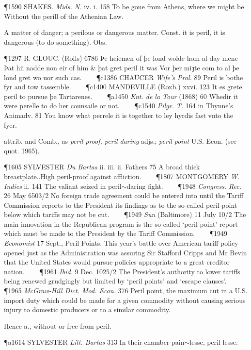 \begin{description}[wide, labelwidth=!, labelindent=0pt]
\begin{myenumerate}
\P 1590 SHAKES.  \textit{Mids. N.} iv. i. 158 To be gone from Athens, where we might be Without the perill of the Athenian Law.

 A matter of danger; a perilous or dangerous matter. Const. it is peril, it is dangerous (to do something). Obs.

\P 1297 R. GLOUC.  (Rolls) 6786 Þe heiemen of þe lond wolde hom al day mene Þat hii nadde non eir of him \& þat gret peril it was Vor þer miȝte com to al þe lond gret wo uor such cas.    
\P c1386 CHAUCER  \textit{Wife's Prol.} 89 Peril is bothe fyr and tow tassemble.    
\P c1400 MANDEVILLE (Roxb.) xxvi. 123 It es grete peril to pursue þe Tartarenes.    
\P a1450  \textit{Knt. de la Tour} (1868) 60 Whedir it were perelle to do her counsaile or not.    
\P c1540  \textit{Pilgr. T.} 164 in Thynne's Animadv. 81 You know what perrele it is together to ley hyrdis fast vnto the fyer.

 attrib. and Comb., as \textit{peril-proof, peril-daring} adjs.; \textit{peril point} U.S. Econ. (see quot. 1965).

\P 1605 SYLVESTER  \textit{Du Bartas} ii. iii. ii. Fathers 75 A broad thick breastplate..High peril-proof against affliction.    
\P 1807 MONTGOMERY  \textit{W. Indies} ii. 141 The valiant seized in peril$\sim$daring fight.    
\P 1948 \textit{Congress.  Rec.} 26 May 6503/2 No foreign trade agreement could be entered into until the Tariff Commission reports to the President its findings as to the so-called peril-point below which tariffs may not be cut.    
\P 1949 \textit{Sun}  (Baltimore) 11 July 10/2 The main innovation in the Republican program is the so-called ‘peril-point’ report which must be made to the President by the Tariff Commission.    
\P 1949  \textit{Economist} 17 Sept., Peril Points. This year's battle over American tariff policy opened just as the Administration was assuring Sir Stafford Cripps and Mr Bevin that the United States would pursue policies appropriate to a great creditor nation.    
\P 1961  \textit{Ibid.} 9 Dec. 1025/2 The President's authority to lower tariffs being renewed grudgingly but limited by ‘peril points’ and ‘escape clauses’.    
\P 1965 \textit{McGraw-Hill  Dict. Mod. Econ.} 376 Peril point, the maximum cut in a U.S. import duty which could be made for a given commodity without causing serious injury to domestic producers or to a similar commodity.

\noindent Hence  a., without or free from peril.

\P a1614 SYLVESTER  \textit{Litt. Bartas} 313 In their chamber pain$\sim$lesse, peril-lesse.




\end{myenumerate}
\end{description}
